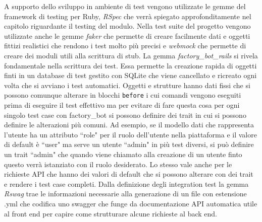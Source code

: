 \documentclass[target=bach,aauheader=,style=]{thud}
\begin{document}
A supporto dello sviluppo in ambiente di test vengono utilizzate le gemme del framework di testing per Ruby, \textit{RSpec} \cite{rspec_home} che verrà spiegato
approfonditamente nel capitolo riguardante il testing del modulo. Nella test suite del progetto vengono utilizzate anche le gemme \textit{faker} \cite{faker_gem}
che permette di creare facilmente dati e oggetti fittizi realistici che rendono i test molto più precisi e \textit{webmock} che permette di creare dei moduli utili
alla scrittura di stub. La gemma \textit{factory\_bot\_rails} \cite{factory_bot_rails_gem} si rivela fondamentale nella scrittura dei test.
Essa permette la creazione rapida di oggetti finti in un database di test gestito con SQLite che viene cancellato e ricreato ogni volta che si avviano i test automatici.
Oggetti e strutture hanno dati fissi che si possono comunque alterare in blocchi \texttt{before} i cui comandi vengono eseguiti prima di eseguire il test effettivo ma per evitare di
fare questa cosa per ogni singolo test case con factory\_bot si possono definire dei trait in cui si possono definire le alterazioni più comuni.
Ad esempio, se il modello dati che rappresenta l'utente ha un attributo ``role" per il ruolo dell'utente nella piattaforma e il valore di default è ``user" ma serve un utente ``admin" in più test
diversi, si può definire un trait ``admin" che quando viene chiamato alla creazione di un utente finto questo verrà istanziato con il ruolo desiderato.
Lo stesso vale anche per le richieste API che hanno dei valori di default che si possono alterare con dei trait e rendere i test case completi.
Dalla definizione degli integration test la gemma \textit{Rswag} \cite{rswag_gem} trae le informazioni necessarie alla generazione di un file con estensione .yml che codifica uno swagger che funge
da documentazione API automatica utile al front end per capire come strutturare alcune richieste al back end.
\end{document}
